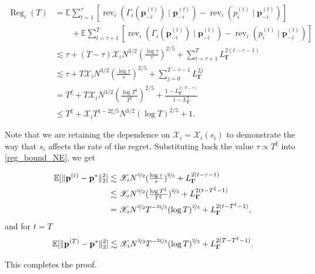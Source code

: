 \documentclass{article} %
\begin{document}
\begin{align*}
\operatorname{Reg}_i(T)&=\mathbb{E} \sum_{t =1}^{\tau}[  \operatorname{rev}_i(\Gamma_i(\mathbf{p}^{(t)}_{-i}) \mid \mathbf{p}_{-i}^{(t)}) -  \operatorname{rev}_i(p^{(t)}_i \mid \mathbf{p}_{-i}^{(t)}) ] \\
&\qquad+ \mathbb{E} \sum_{t =\tau+1}^T[  \operatorname{rev}_i(\Gamma_i(\mathbf{p}^{(t)}_{-i}) \mid \mathbf{p}_{-i}^{(t)}) -  \operatorname{rev}_i(p^{(t)}_i \mid \mathbf{p}_{-i}^{(t)}) ]\\
& \lesssim \tau + (T-\tau)  \mathscr{X}_iN^{3/2}\left(\frac{
\log \tau}{\tau} \right)^{2/5} +\sum_{t=\tau+1}^TL^{2(t-\tau-1)}_{\boldsymbol{\Gamma}}\\
& \lesssim \tau + T\mathscr{X}_i
 N^{3/2}\left(\frac{
\log \tau}{\tau} \right)^{2/5} +\sum_{j=0}^{T-\tau-1}L^{2j}_{\boldsymbol{\Gamma}}\\
& = T^{\xi} + T\mathscr{X}_i
N^{3/2}\left(\frac{
\log T^{\xi}}{T^{\xi}} \right)^{2/5} +\frac{1-L^{2(T-\tau)}_{\boldsymbol{\Gamma}}}{1-L^{2}_{\boldsymbol{\Gamma}}}\\
& \leq T^{\xi} + \mathscr{X}_iT^{1-2\xi/5}N^{3/2}\left(
\log T\right)^{2/5} +1.
\end{align*}

Note that we are retaining the dependence on $\mathscr{X}_i= \mathscr{X}_i(s_i)$ to demonstrate the way that $s_i$ affects the rate of the regret. Substituting back the value $\tau \propto T^{\xi}$ into \cref{reg_bound_NE}, we get 

\begin{align*}
\mathbb{E}[ \|\mathbf{p}^{(t)}-\mathbf{p}^{*}\|_2^2] & \lesssim \mathscr{X}_iN ^{\nicefrac{3}{2}}(\tfrac{\log \tau}{\tau})^{\nicefrac{2}{5}}+L^{2(t-\tau-1)}_{\boldsymbol{\Gamma}} \\
&\lesssim \mathscr{X}_iN ^{\nicefrac{3}{2}}(\tfrac{\log T^\xi}{T^\xi})^{\nicefrac{2}{5}}+L^{2(t-T^{\xi}-1)}_{\boldsymbol{\Gamma}}\\
&= \mathscr{X}_iN ^{\nicefrac{3}{2}}T ^{-\nicefrac{2\xi}{5}}(\log T)^{\nicefrac{2}{5}}+L^{2(t-T^{\xi}-1)}_{\boldsymbol{\Gamma}},
\end{align*}
and for $t=T$
$$
\mathbb{E}[ \|\mathbf{p}^{(T)}-\mathbf{p}^{*}\|_2^2]\lesssim \mathscr{X}_iN ^{\nicefrac{3}{2}}T ^{-\nicefrac{2\xi}{5}}(\log T)^{\nicefrac{2}{5}}+L^{2(T-T^{\xi}-1)}_{\boldsymbol{\Gamma}}.
$$

This completes the proof. 
\end{document}
